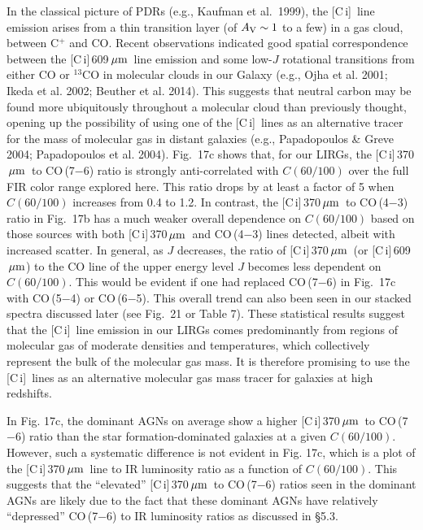\documentclass[preprint]{aastex}
\newcommand{\um}{\mbox{$\,\mu{\rm m}$}}
\newcommand{\CI}{[C\,{\sc i}]}
\begin{document}
In the classical picture of PDRs (e.g., Kaufman et al.~1999), the \CI\ line
emission arises 
from a thin transition layer (of $A_{\rm V} \sim 1$ to a few) in a gas
cloud, between C$^+$ and CO.   Recent observations indicated good spatial 
correspondence between the \CI\,609\um\ line emission and some low-$J$ rotational 
transitions from either CO or $^{13}$CO in molecular clouds in our Galaxy
(e.g., Ojha et al. 2001; Ikeda et al. 2002; Beuther et al. 2014).  
This suggests that neutral carbon may be found more ubiquitously throughout 
a molecular cloud 
than previously thought, opening up the possibility  of using one of the \CI\ 
lines as an alternative tracer for the mass of molecular 
gas in distant galaxies (e.g., Papadopoulos \& Greve 2004; Papadopoulos et 
al. 2004).  Fig.~17c shows that, for our LIRGs, the \CI\,370\um\ to CO\,(7$-$6) 
ratio is strongly anti-correlated with $C(60/100)$ over the full FIR color range 
explored here.  This ratio drops by at least a factor of 5 when $C(60/100)$
increases from 0.4 to 1.2.   In contrast, the \CI\,370\um\ to CO\,(4$-$3) ratio 
in Fig.~17b has a much weaker overall dependence on $C(60/100)$ based on those
sources with both \CI\,370\um\ and CO\,(4$-$3) lines detected, albeit with 
increased scatter.  In general, as $J$ decreases, the ratio of \CI\,370\um\ 
(or \CI\,609\um) to the CO line of the upper energy level $J$ becomes less 
dependent on $C(60/100)$.  This would be evident if one had replaced CO\,(7$-$6)
in Fig.~17c with CO\,(5$-$4) or CO\,(6$-$5).  This overall trend can also
been seen in our stacked spectra discussed later (see Fig.~21 or Table 7).
These statistical results suggest that the \CI\ line emission in our LIRGs 
comes predominantly from regions of molecular gas of moderate densities and 
temperatures, which collectively represent the bulk of the molecular gas 
mass.  It is therefore promising to use the \CI\ lines as an alternative 
molecular gas mass tracer for galaxies at high redshifts.


In Fig. 17c, the dominant AGNs on average show a higher \CI\,370\um\ 
to CO\,(7$-$6) ratio than the star formation-dominated galaxies at a given
$C(60/100)$.  However, such a systematic difference is not evident in Fig.
17c, which is a plot of the \CI\,370\um\ line to IR luminosity ratio as 
a function of $C(60/100)$.  This suggests that the ``elevated'' \CI\,370\um\
to CO\,(7$-$6) ratios seen in the dominant AGNs are likely due to the fact
that these dominant AGNs have relatively ``depressed'' CO\,(7$-$6) to IR 
luminosity ratios as discussed in \S5.3.
\end{document}
